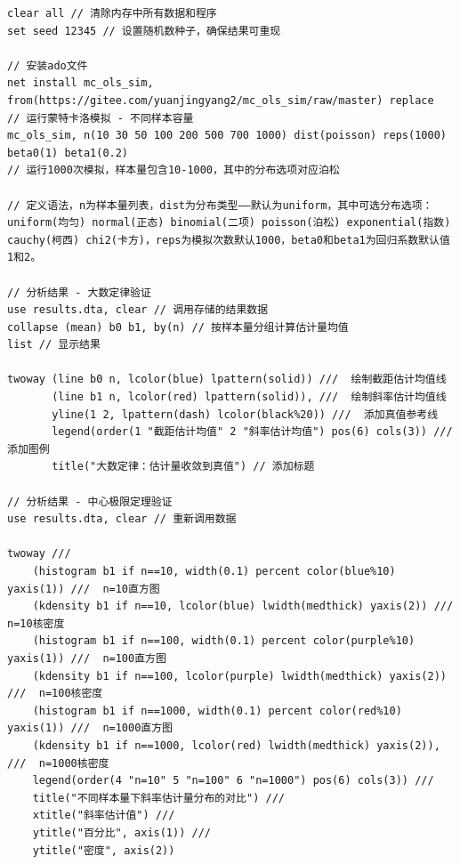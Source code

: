 \begin{tcolorbox}[title=在 Stata 中运用模拟法验证大样本假定, colback=white, colframe=black, colbacktitle=white, coltitle=black,fonttitle=\bfseries]
	\begin{lstlisting}[xleftmargin=2em,
		basicstyle=\ttfamily\small\color{black},
		keywordstyle=\color{black},
		commentstyle=\color{black},
		stringstyle=\color{black},
		identifierstyle=\color{black},
		numberstyle=\color{black},
		showstringspaces=false,
		morekeywords={clear, set, seed, net, install, mc_ols_sim, from, replace, use, collapse, list, twoway, histogram, kdensity, line, title, legend, yline, xline, aspectratio, plotregion, graphregion, save, color}]
clear all // 清除内存中所有数据和程序
set seed 12345 // 设置随机数种子，确保结果可重现

// 安装ado文件
net install mc_ols_sim, from(https://gitee.com/yuanjingyang2/mc_ols_sim/raw/master) replace
// 运行蒙特卡洛模拟 - 不同样本容量
mc_ols_sim, n(10 30 50 100 200 500 700 1000) dist(poisson) reps(1000) beta0(1) beta1(0.2)
// 运行1000次模拟，样本量包含10-1000，其中的分布选项对应泊松

// 定义语法，n为样本量列表，dist为分布类型——默认为uniform，其中可选分布选项：uniform(均匀) normal(正态) binomial(二项) poisson(泊松) exponential(指数) cauchy(柯西) chi2(卡方)，reps为模拟次数默认1000，beta0和beta1为回归系数默认值1和2。

// 分析结果 - 大数定律验证
use results.dta, clear // 调用存储的结果数据
collapse (mean) b0 b1, by(n) // 按样本量分组计算估计量均值
list // 显示结果

twoway (line b0 n, lcolor(blue) lpattern(solid)) ///  绘制截距估计均值线
       (line b1 n, lcolor(red) lpattern(solid)), ///  绘制斜率估计均值线
       yline(1 2, lpattern(dash) lcolor(black%20)) ///  添加真值参考线
       legend(order(1 "截距估计均值" 2 "斜率估计均值") pos(6) cols(3)) ///  添加图例
       title("大数定律：估计量收敛到真值") // 添加标题

// 分析结果 - 中心极限定理验证
use results.dta, clear // 重新调用数据

twoway ///
    (histogram b1 if n==10, width(0.1) percent color(blue%10) yaxis(1)) ///  n=10直方图
    (kdensity b1 if n==10, lcolor(blue) lwidth(medthick) yaxis(2)) ///  n=10核密度
    (histogram b1 if n==100, width(0.1) percent color(purple%10) yaxis(1)) ///  n=100直方图
    (kdensity b1 if n==100, lcolor(purple) lwidth(medthick) yaxis(2)) ///  n=100核密度
    (histogram b1 if n==1000, width(0.1) percent color(red%10) yaxis(1)) ///  n=1000直方图
    (kdensity b1 if n==1000, lcolor(red) lwidth(medthick) yaxis(2)), ///  n=1000核密度
    legend(order(4 "n=10" 5 "n=100" 6 "n=1000") pos(6) cols(3)) ///
    title("不同样本量下斜率估计量分布的对比") ///
    xtitle("斜率估计值") ///
    ytitle("百分比", axis(1)) ///
    ytitle("密度", axis(2))
	\end{lstlisting}
\end{tcolorbox}

